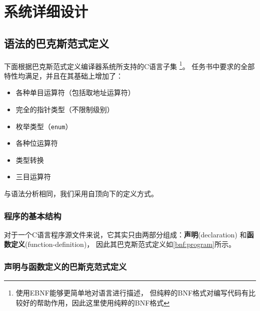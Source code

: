 \chapter{系统详细设计}


\section{语法的巴克斯范式定义}

下面根据巴克斯范式定义编译器系统所支持的C语言子集
\footnote{使用EBNF能够更简单地对语言进行描述，
	但纯粹的BNF格式对编写代码有比较好的帮助作用，因此这里使用纯粹的BNF格式}。
任务书中要求的全部特性均满足，并且在其基础上增加了：
\begin{itemize}
	\item 各种单目运算符（包括取地址运算符）
	\item 完全的指针类型（不限制级别）
	\item 枚举类型（{\tt enum}）
	\item 各种位运算符
	\item 类型转换
	\item 三目运算符
\end{itemize}

与语法分析相同，我们采用自顶向下的定义方式。

\subsection{程序的基本结构}

对于一个C语言程序源文件来说，它其实只由两部分组成：{\bf 声明}(declaration)
和{\bf 函数定义}(function-definition)，
因此其巴克斯范式定义如\autoref{bnf:program}所示。

\begin{bnf}
	\label{bnf:program}
\end{bnf}

\subsection{声明与函数定义的巴斯克范式定义}

